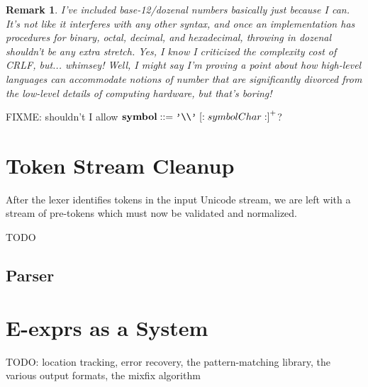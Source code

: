 \documentclass[11pt]{article} %
\newtheorem*{remark}{Remark}
\begin{document}
\begin{remark}
I've included base-12/dozenal numbers basically just because I can.
It's not like it interferes with any other syntax, and once an implementation has procedures for binary, octal, decimal, and hexadecimal, throwing in dozenal shouldn't be any extra stretch.
Yes, I know I criticized the complexity cost of CRLF, but...
  \textit{\raisebox{0.2ex}w\raisebox{0.4ex}h\raisebox{0.3ex}i\raisebox{0.1ex}m\raisebox{-0.4ex}s\raisebox{-0.2ex}e\raisebox{0.5ex}y}!
Well, I might say I'm proving a point about how high-level languages can accommodate notions of number that are significantly divorced from the low-level details of computing hardware, but that's boring!
\end{remark}





FIXME: shouldn't I allow $\mathbf{symbol} ::= \texttt{'{\textbackslash\textbackslash}'}\;\mathopen{[\mathord:\;} symbolChar \mathclose{\;\mathord:]}^+$?

\section{Token Stream Cleanup}

After the lexer identifies tokens in the input Unicode stream, we are left with a stream of pre-tokens which must now be validated and normalized.

TODO

\subsection{Parser}

\section{E-exprs as a System}

TODO: location tracking, error recovery, the pattern-matching library, the various output formats, the mixfix algorithm
\end{document}

